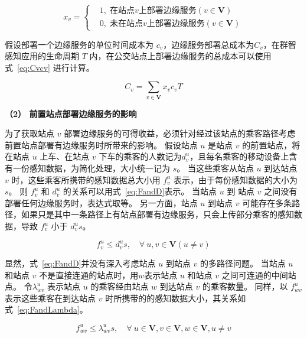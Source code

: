 \begin{equation}
\label{eq:xdefine}
x_v =\left\{
\begin{aligned}
&1, \; 在站点 v 上部署边缘服务 (v\in \boldsymbol{V})\\
&0, \; 未在站点 v 上部署边缘服务 (v\in \boldsymbol{V})
\end{aligned}
\right.
\end{equation}

假设部署一个边缘服务的单位时间成本为 $c_v$，边缘服务部署总成本为$C_v$，在群智感知应用的生命周期 $T$ 内，在公交站点上部署边缘服务的总成本可以使用式~\eqref{eq:Cvcv} 进行计算。

\begin{equation}
\label{eq:Cvcv}
C_v = \sum_{v\in \boldsymbol{V}}x_v c_v T
\end{equation}

\textbf{（2） 前置站点部署边缘服务的影响}

为了获取站点 $v$ 部署边缘服务的可得收益，必须针对经过该站点的乘客路径考虑前置站点部署有边缘服务时所带来的影响。
假设站点 $u$ 是站点 $v$ 的前置站点，将在站点 $u$ 上车、在站点 $v$ 下车的乘客的人数记为$d^u_v$，且每名乘客的移动设备上含有一份感知数据，为简化处理，大小统一记为 $s$。
当这些乘客从站点 $u$ 到达站点 $v$ 时，这些乘客所携带的感知数据总大小用 $f^u_v$ 表示，由于每份感知数据的大小为 $s$。
则 $f^u_v$ 和 $d^u_v$ 的关系可以用式~\eqref{eq:FandD}表示。
当站点 $u$ 到 站点 $v$ 之间没有部署任何边缘服务时，表达式取等。
另一方面，站点 $u$ 到站点 $v$ 可能存在多条路径，如果只是其中一条路径上有站点部署有边缘服务，只会上传部分乘客的感知数据，导致 $f^u_v$ 小于 $d^u_v s$。

\begin{equation}
\label{eq:FandD}
f^u_v \leq d^u_v s, \quad \forall \ u, v\in \boldsymbol{V} (u \neq v)
\end{equation}

显然，式~\eqref{eq:FandD}并没有深入考虑站点 $u$ 到站点 $v$ 的多路径问题。
当站点 $u$ 和站点 $v$ 不是直接连通的站点时，用$w$表示站点 $u$ 和站点 $v$ 之间可连通的中间站点。
令$\lambda^u_{wv}$ 表示站点 $u$ 的乘客经由站点 $w$ 到达站点 $v$ 的乘客数量。
同样，以 $f^u_{wv}$ 表示这些乘客在到达站点 $v$ 时所携带的的感知数据大小，其关系如式~\eqref{eq:FandLambda}。

\begin{equation}
\label{eq:FandLambda}
f^u_{wv} \leq \lambda^u_{wv} s, \quad \forall \  u \in \boldsymbol{V}, v \in \boldsymbol{V}, w \in \boldsymbol{V}, u \neq v
\end{equation}


